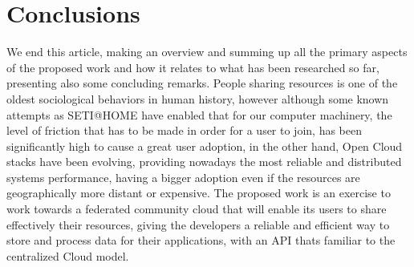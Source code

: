 
% 
% 

\section{Conclusions}

We end this article, making an overview and summing up all the primary aspects of the proposed work and how it relates to what has been researched so far, presenting also some concluding remarks.
People sharing resources is one of the oldest sociological behaviors in human history, however although some known attempts as SETI@HOME have enabled that for our computer machinery, the level of friction that has to be made in order for a user to join, has been significantly high to cause a great user adoption, in the other hand, Open Cloud stacks have been evolving, providing nowadays the most reliable and distributed systems performance, having a bigger adoption even if the resources are geographically more distant or expensive.
The proposed work is an exercise to work towards a federated community cloud that will enable its users to share effectively their resources, giving the developers a reliable and efficient way to store and process data for their applications, with an API thats familiar to the centralized Cloud model.